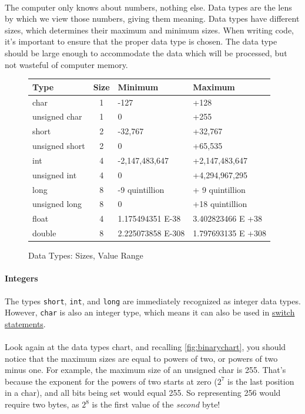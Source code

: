 \documentclass[letter,11pt]{article}
\begin{document}
\paragraph{}The computer only knows about numbers, nothing else. Data types are the lens by which we view those numbers, giving them meaning. Data types have different sizes, which determines their maximum and minimum sizes. When writing code, it's important to ensure that the proper data type is chosen. The data type should be large enough to accommodate the data which will be processed, but not wasteful of computer memory.
\begin{figure}[h!]
    \centering
    \begin{tabular}{lcll}
        Type           & Size & Minimum & Maximum \\ \hline
        char           & 1    & -127    & +128 \\
        unsigned char  & 1    & 0       & +255 \\
        short          & 2    & -32,767 & +32,767   \\
        unsigned short & 2    & 0       & +65,535 \\
        int            & 4    & -2,147,483,647 & +2,147,483,647 \\
        unsigned int   & 4    & 0              & +4,294,967,295 \\
        long           & 8    & -9 quintillion & + 9 quintillion \\
        unsigned long  & 8    & 0              & +18 quintillion \\
        float          & 4    & 1.175494351 E-38  & 3.402823466 E +38 \\
        double         & 8    & 2.225073858 E-308 & 1.797693135 E +308
    \end{tabular}
    \caption{Data Types: Sizes, Value Range}
    \label{fig:datatypeschart}
\end{figure}

\paragraph{Integers}The types \texttt{short}, \texttt{int}, and \texttt{long} are immediately recognized as integer data types. However, \texttt{char} is also an integer type, which means it can also be used in \hyperref[sec:switchcase]{switch statements}.

\paragraph{}Look again at the data types chart, and recalling \autoref{fig:binarychart}, you should notice that the maximum sizes are equal to powers of two, or powers of two minus one. For example, the maximum size of an unsigned char is 255. That's because the exponent for the powers of two starts at zero ($2^7$ is the last position in a char), and all bits being set would equal 255. So representing 256 would require two bytes, as $2^8$ is the first value of the \textit{second} byte!
\end{document}
